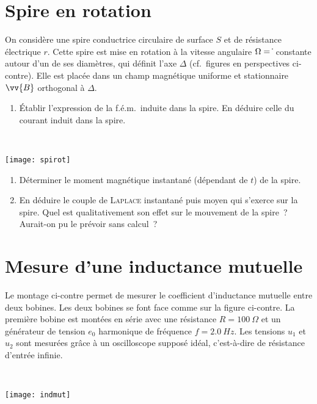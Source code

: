 \documentclass[a4paper, 10pt, final, garamond]{book}
\begin{document}
\section{Spire en rotation}
\label{sec:spirerot}

\noindent
\begin{minipage}[t]{.6\linewidth}
  On considère une spire conductrice circulaire de surface $S$ et de résistance
  électrique $r$. Cette spire est mise en rotation à la vitesse angulaire $\Omega
  = \dot{\tt}$ constante autour d'un de ses diamètres, qui définit l'axe
  $\Delta{}$ (cf.\ figures en perspectives ci-contre). Elle est placée dans un
  champ magnétique uniforme et stationnaire $\vv{B}$ orthogonal à $\Delta{}$.
  \begin{enumerate}
    \item Établir l'expression de la f.é.m.\ induite dans la spire. En déduire
      celle du courant induit dans la spire.
  \end{enumerate}
\end{minipage}
\hfill
\begin{minipage}[t]{.39\linewidth}
  ~
  \vspace{-10pt}
  \begin{center}
    \texttt{[image: spirot]}
    \label{fig:spirot}
  \end{center}
\end{minipage}

\begin{enumerate}[start=2]
  \item Déterminer le moment magnétique instantané (dépendant de $t$) de la spire.
  \item En déduire le couple de \textsc{Laplace} instantané puis moyen qui
    s'exerce sur la spire. Quel est qualitativement son effet sur le mouvement
    de la spire~? Aurait-on pu le prévoir sans calcul~?
\end{enumerate}

\section{Mesure d'une inductance mutuelle}
\label{sec:mesindmut}

\noindent
\begin{minipage}[t]{.6\linewidth}
  Le montage ci-contre permet de mesurer le coefficient d'inductance mutuelle
  entre deux bobines. Les deux bobines se font face comme sur la figure
  ci-contre. La première bobine est montées en série avec une résistance $R =
  \SI{100}{\Omega}$ et un générateur de tension $e_0$ harmonique de fréquence $f
  = \SI{2.0}{Hz}$. Les tensions $u_1$ et $u_2$ sont mesurées grâce à un
  oscilloscope supposé idéal, c'est-à-dire de résistance d'entrée infinie.
\end{minipage}
\hfill
\begin{minipage}[t]{.39\linewidth}
  ~
  \vspace{-10pt}
  \begin{center}
    \texttt{[image: indmut]}
    \label{fig:mesindmut}
  \end{center}
\end{minipage}
\end{document}

